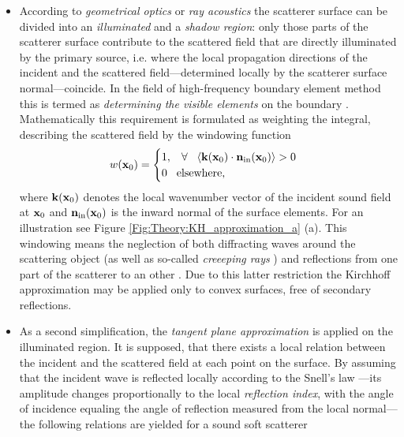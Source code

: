 \begin{itemize}
%
\item According to \emph{geometrical optics} or \emph{ray acoustics} the scatterer surface can be divided into an \emph{illuminated} and a \emph{shadow region}: only those parts of the scatterer surface contribute to the scattered field that are directly illuminated by the primary source, i.e. where the local propagation directions of the incident and the scattered field---determined locally by the scatterer surface normal---coincide.
In the field of high-frequency boundary element method this is termed as \emph{determining the visible elements} on the boundary \cite{Herrin2003}.
Mathematically this requirement is formulated as weighting the integral, describing the scattered field by the windowing function
\begin{equation}
w(\mathbf{x}_0) = \begin{cases}
                        1, \hspace{3mm} \forall \hspace{3mm} \langle \mathbf{k}(\mathbf{x}_0) \cdot \mathbf{n}_{\mathrm{in}}(\mathbf{x}_0) \rangle > 0 \\
                        0  \hspace{3mm} \text{elsewhere},
                    \end{cases}
\label{eq:theory:windowing_function}
\end{equation}
where $\mathbf{k}(\mathbf{x}_0)$ denotes the local wavenumber vector of the incident sound field at $\mathbf{x}_0$ and $ \mathbf{n}_{\mathrm{in}}(\mathbf{x}_0)$ is the inward normal of the surface elements. For an illustration see Figure \ref{Fig:Theory:KH_approximation_a} (a).
%
This windowing means the neglection of both diffracting waves around the scattering object (as well as so-called \emph{creeeping rays} \cite{Bleistein1984}) and reflections from one part of the scatterer to an other \cite{Pignier2015}. 
Due to this latter restriction the Kirchhoff approximation may be applied only to convex surfaces, free of secondary reflections.
%
\item As a second simplification, the \emph{tangent plane approximation} is applied on the illuminated region.
It is supposed, that there exists a local relation between the incident and the scattered field at each point on the surface.
By assuming that the incident wave is reflected locally according to the Snell's law  \cite{Voronich2007}---its amplitude changes proportionally to the local \emph{reflection index}, with the angle of incidence equaling the angle of reflection measured from the local normal---the following relations are yielded for a sound soft scatterer \cite{Bleistein1984, Bleistein2000, Pike2002}

\end{itemize}
